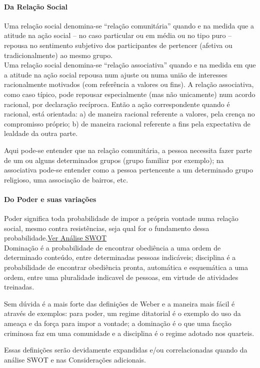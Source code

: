 \documentclass[
	12pt,				%
	openright,			%
	twoside,			%
	a4paper,			%
	chapter=TITLE,		%
	section=TITLE,		%
	subsection=TITLE,	%
	subsubsection=TITLE,%
	spanish,            %
	english,			%
	brazil				%
	]{abntex2}
\begin{document}
\paragraph*{\textbf{Da Relação Social}}
\begin{citacao}
	Uma relação social denomina-se “relação comunitária” quando e na medida que a atitude na ação social -- no caso particular ou em média
	ou no tipo puro -- repousa no sentimento subjetivo  dos participantes de pertencer (afetiva ou tradicionalmente) ao mesmo grupo.\\
	Uma relação social denomina-se “relação associativa” quando e na medida em que a atitude na ação social repousa num ajuste ou numa união de interesses racionalmente motivados (com referência a valores ou fins). A relação associativa, como caso típico, pode repousar especialmente (mas não unicamente) num acordo racional, por declaração recíproca. Então a ação correspondente quando é racional, está orientada: a) de maneira racional referente a valores, pela crença no compromisso próprio; b) de maneira racional referente a fins pela expectativa de lealdade da outra parte.\cite[p. ~25]{Weber}
	\end{citacao}
\par
Aqui pode-se entender que na relação comunitária, a pessoa necessita fazer parte de um ou alguns determinados grupos (grupo familiar por exemplo); na associativa pode-se entender como a pessoa pertencente a um determinado grupo religioso, uma associação de bairros, etc.
\hypertarget{poder}{}
\paragraph*{\textbf{Do Poder e suas variações}}
\begin{citacao}
	Poder significa toda probabilidade de impor a própria vontade numa relação social, mesmo contra resistências, seja qual for o fundamento dessa probabilidade.\hyperlink{S2}{Ver Análise SWOT}\\
	Dominação é a probabilidade de encontrar obediência a uma ordem de determinado conteúdo, entre determinadas pessoas indicáveis; disciplina
	é a probabilidade de encontrar obediência pronta, automática e esquemática a uma ordem, entre uma pluralidade indicavel de pessoas, em virtude de atividades treinadas.\cite[p. ~33]{Weber}
\end{citacao}
\par
Sem dúvida é a mais forte das definições de Weber e a maneira mais fácil é através de exemplos: para poder, um regime ditatorial é o exemplo do uso da ameaça e da força para impor a vontade; a dominação é o que uma facção criminosa faz em uma comunidade e a disciplina é o regime adotado nos quarteis.
\par
Essas definições serão devidamente expandidas e/ou correlacionadas quando da análise SWOT e nas Considerações adicionais.
\end{document}

